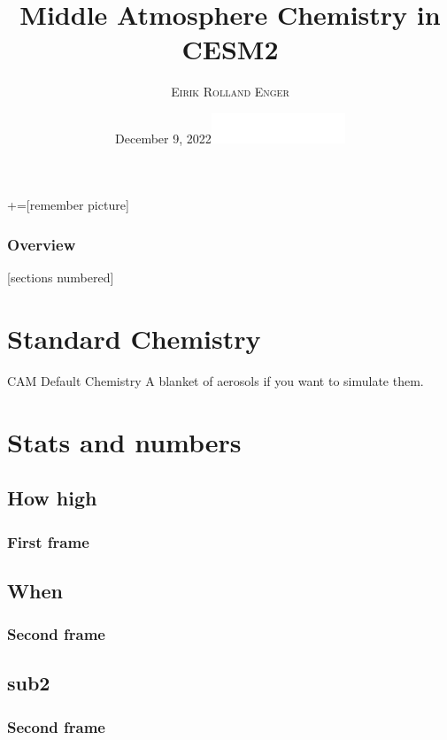 \documentclass[xcolor=dvipsnames]{beamer} %
\title[MA in CESM2]{Middle Atmosphere Chemistry in CESM2}
\author{\textsc{Eirik Rolland Enger}}
\date{\vspace{-3mm}December 9, 2022\hfill\includegraphics[width=4cm]{utils/CSU-Official-wrdmrk-Rev-2.png}}
\begin{document}
\maketitle

+=[remember picture]
\everymath{\displaystyle}

\begin{frame}%
	\frametitle{Overview}

	[sections numbered]
	\tableofcontents[hideallsubsections]

\end{frame}

\section{Standard Chemistry}

\begin{frame}{CAM Default Chemistry}
    A blanket of aerosols if you want to simulate them.
\end{frame}

\section{Stats and numbers}

\subsection{How high}
\begin{frame}
	\frametitle{First frame}
\end{frame}

\subsection{When}
\begin{frame}
	\frametitle{Second frame}
\end{frame}

\subsection{sub2}
\begin{frame}
	\frametitle{Second frame}
\end{frame}
\end{document}
